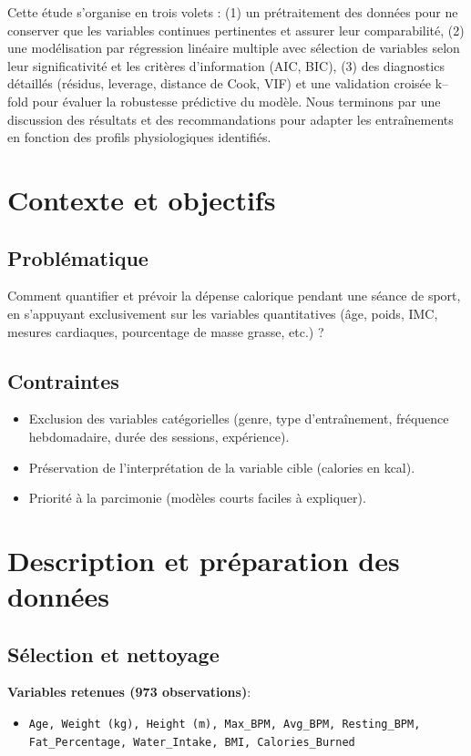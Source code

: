 \documentclass[12pt,a4paper]{article}
\begin{document}
Cette étude s’organise en trois volets : (1) un prétraitement des données pour ne conserver que les variables continues pertinentes et assurer leur comparabilité, (2) une modélisation par régression linéaire multiple avec sélection de variables selon leur significativité et les critères d’information (AIC, BIC), (3) des diagnostics détaillés (résidus, leverage, distance de Cook, VIF) et une validation croisée k–fold pour évaluer la robustesse prédictive du modèle. Nous terminons par une discussion des résultats et des recommandations pour adapter les entraînements en fonction des profils physiologiques identifiés.


\section{Contexte et objectifs}

\subsection{Problématique}
Comment quantifier et prévoir la dépense calorique pendant une séance de sport, en s’appuyant exclusivement sur les variables quantitatives (âge, poids, IMC, mesures cardiaques, pourcentage de masse grasse, etc.) ?

\subsection{Contraintes}
\begin{itemize}
    \item Exclusion des variables catégorielles (genre, type d’entraînement, fréquence hebdomadaire, durée des sessions, expérience).
    \item Préservation de l’interprétation de la variable cible (calories en kcal).
    \item Priorité à la parcimonie (modèles courts faciles à expliquer).
\end{itemize}


\section{Description et préparation des données}

\subsection{Sélection et nettoyage}
\textbf{Variables retenues (973 observations)}:
\begin{itemize}
    \item \texttt{Age, Weight (kg), Height (m), Max\_BPM, Avg\_BPM, Resting\_BPM,\\ Fat\_Percentage, Water\_Intake, BMI, Calories\_Burned}
\end{itemize}
\end{document}
